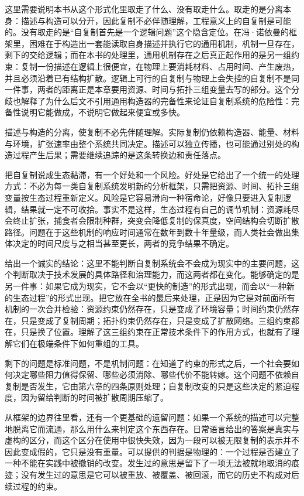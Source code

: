 这里需要说明本书从这个形式化里取走了什么、没有取走什么。取走的是分离本身：描述与构造可以分开，因此复制不必伴随理解，工程意义上的自复制是可能的。没有取走的是“自复制首先是一个逻辑问题”这个隐含定位。在冯·诺依曼的框架里，困难在于构造出一套能读取自身描述并执行它的通用机制，机制一旦存在，剩下的交给逻辑；而在本书的处理里，通用机制存在之后真正起作用的是另一组约束：复制一份描述在逻辑上很便宜，在物理上要消耗材料、占用时间、产生废热，并且必须沿着已有结构扩散。逻辑上可行的自复制与物理上会失控的自复制不是同一件事，两者的距离正是本章要用资源、时间与拓扑三组变量去写的部分。这个分歧也解释了为什么后文不引用通用构造器的完备性来论证自复制系统的危险性：完备性说明它能做成，不说明它做起来便宜或多快。

描述与构造的分离，使复制不必先伴随理解。实际复制仍依赖构造器、能量、材料与环境，扩张速率由整个系统共同决定。描述可以独立传播，也可能通过别处的构造过程产生后果；需要继续追踪的是这条转换边和责任落点。


把自复制说成生态黏滞，有一个好处和一个风险。好处是它给出了一个统一的处理方式：不必为每一类自复制系统发明新的分析框架，只需把资源、时间、拓扑三组变量按生态过程重新定义。风险是它容易滑向一种宿命论，好像只要进入复制逻辑，结果就一定不可收拾。事实不是这样，生态过程有自己的调节机制：资源耗尽会终止扩张，捕食者会限制种群，突变会降低复制的保真度，空间结构会切断扩散路径。问题在于这些机制的响应时间通常在数年到数十年量级，而人类社会做出集体决定的时间尺度与之相当甚至更长，两者的竞争结果不确定。

给出一个诚实的结论：这里不能判断自复制系统会不会成为现实中的主要问题，这个判断取决于技术发展的具体路径和治理能力，而这两者都在变化。能够确定的是另一件事：如果它成为现实，它不会以“更快的制造”的形式出现，而会以“一种新的生态过程”的形式出现。把它放在全书的最后来处理，正是因为它是对前面所有机制的一次合并检验：资源约束仍然存在，只是变成了环境容量；时间约束仍然存在，只是变成了复制周期；拓扑约束仍然存在，只是变成了扩散网络。三组约束都在，只是换了位置。理解了这三组约束在正常技术条件下的作用方式，也就有了理解它们在极端条件下如何重组的工具。

剩下的问题是标准问题，不是机制问题：在知道了约束的形式之后，一个社会要如何决定哪些阻力值得保留、哪些必须消除、哪些代价不能转嫁。这个问题不依赖自复制是否发生，它由第六章的四条原则处理；自复制改变的只是这些决定的紧迫程度，因为留给判断的时间被扩散周期压缩了。


从框架的边界往里看，还有一个更基础的遗留问题：如果一个系统的描述可以完整地脱离它而流通，那么用什么来判定这个东西存在。日常语言给出的答案是真实与虚构的区分，而这个区分在使用中很快失效，因为一段可以被无限复制的表示并不因此变成假的，它只是没有重量。可以提供的判据是物理的：一个过程是否建立了一种不能在实践中被撤销的改变。发生过的意思是留下了一项无法被就地取消的痕迹；没有发生过的意思是它可以被重放、被覆盖、被回滚，而它的历史不构成对后续过程的约束。

